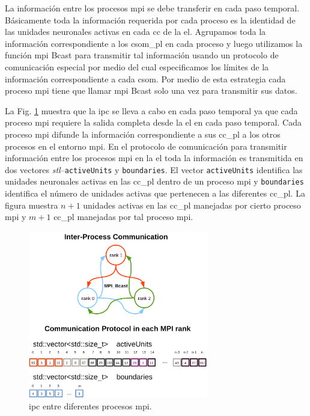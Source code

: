 {La información entre los procesos \gls{mpi} se debe transferir en cada paso temporal.
Básicamente toda la información requerida por cada proceso es la identidad de las unidades neuronales activas en cada \gls{cc} de la \gls{el}.
Agrupamos toda la información correspondiente a los \gls{csom_pl} en cada proceso y luego utilizamos la función \gls{mpi} Bcast para transmitir tal información usando un protocolo de comunicación especial por medio del cual especificamos los límites de la información correspondiente a cada \gls{csom}.
Por medio de esta estrategia cada proceso \gls{mpi} tiene que llamar \gls{mpi} Bcast solo una vez para transmitir sus datos.

La Fig. \ref{fig:BCast} muestra que la \gls{ipc} se lleva a cabo en cada paso temporal ya que cada proceso \gls{mpi} requiere la salida completa desde la \gls{el} en cada paso temporal.
Cada proceso \gls{mpi} difunde la información correspondiente a sus \gls{cc_pl} a los otros procesos en el entorno \gls{mpi}.
En el protocolo de comunicación para transmitir información entre los procesos \gls{mpi} en la \gls{el} toda la información es transmitida en dos vectores \emph{\gls{stl}}--\texttt{activeUnits} y \texttt{boundaries}.
El vector \texttt{activeUnits} identifica las unidades neuronales activas en las \gls{cc_pl} dentro de un proceso \gls{mpi} y \texttt{boundaries} identifica el número de unidades activas que pertenecen a las diferentes \gls{cc_pl}.
La figura muestra $n+1$ unidades activas en las \gls{cc_pl} manejadas por cierto proceso \gls{mpi} y $m+1$ \gls{cc_pl} manejadas por tal proceso \gls{mpi}.

\begin{figure}[h!]
    \centering
    \includegraphics[width=0.7\textwidth]{BCast.png}
    \caption{\gls{ipc} entre diferentes procesos \gls{mpi}.}
    \label{fig:BCast}
\end{figure}

}
